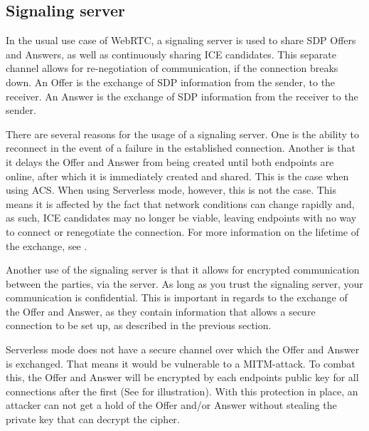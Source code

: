     \subsection{Signaling server}
    \label{sec:sign_serv}
    In the usual use case of WebRTC, a signaling server is used to share SDP Offers and Answers, as well as continuously sharing ICE candidates. This separate channel allows for re-negotiation of communication, if the connection breaks down. An Offer is the exchange of SDP information from the sender, to the receiver. An Answer is the exchange of SDP information from the receiver to the sender.

    There are several reasons for the usage of a signaling server. One is the ability to reconnect in the event of a failure in the established connection. Another is that it delays the Offer and Answer from being created until both endpoints are online, after which it is immediately created and shared. This is the case when using ACS. When using Serverless mode, however, this is not the case. This means it is affected by the fact that network conditions can change rapidly and, as such, ICE candidates may no longer be viable, leaving endpoints with no way to connect or renegotiate the connection. For more information on the lifetime of the exchange, see .

    Another use of the signaling server is that it allows for encrypted communication between the parties, via the server. As long as you trust the signaling server, your communication is confidential. This is important in regards to the exchange of the Offer and Answer, as they contain information that allows a secure connection to be set up, as described in the previous section.

    Serverless mode does not have a secure channel over which the Offer and Answer is exchanged. That means it would be vulnerable to a MITM-attack. To combat this, the Offer and Answer will be encrypted by each endpoints public key for all connections after the first (See  for illustration). With this protection in place, an attacker can not get a hold of the Offer and/or Answer without stealing the private key that can decrypt the cipher.

%
